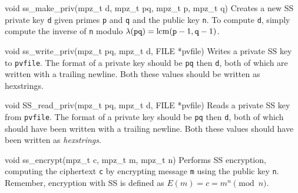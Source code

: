 \begin{funcdoc}{void ss\_make\_priv(mpz\_t d, mpz\_t pq, mpz\_t p, mpz\_t q)}
  Creates a new SS private key \texttt{d} given primes \texttt{p} and
  \texttt{q} and the public key \texttt{n}. To compute \texttt{d}, simply
  compute the inverse of \texttt{n} modulo $\lambda(\texttt{pq}) =
  \operatorname{lcm}(\texttt{p} - 1, \texttt{q} - 1)$.
\end{funcdoc}

\begin{funcdoc}{void ss\_write\_priv(mpz\_t pq, mpz\_t d, FILE
*pvfile)}
  Writes a private SS key to \texttt{pvfile}. The format of a private key
  should be \texttt{pq} then \texttt{d}, both of which are written with a
  trailing newline. Both these values should be written as hexstrings.
\end{funcdoc}

\begin{funcdoc}{void SS\_read\_priv(mpz\_t pq, mpz\_t d, FILE
*pvfile)}
  Reads a private SS key from \texttt{pvfile}. The format of a private
  key should be \texttt{pq} then \texttt{d}, both of which should have
  been written with a trailing newline. Both these values should have
  been written as \emph{hexstrings}.
\end{funcdoc}

\begin{funcdoc}{void ss\_encrypt(mpz\_t c, mpz\_t m, mpz\_t n)}
  Performs SS encryption, computing the ciphertext \texttt{c} by encrypting
  message \texttt{m} using the public key \texttt{n}.
  Remember, encryption with SS is defined as $E(m) = c =
        m^n \pmod{n}$.
\end{funcdoc}

